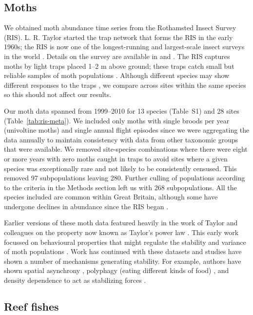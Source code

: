 \subsection{Moths}
We obtained moth abundance time series from the Rothamsted Insect Survey
(RIS). L. R. Taylor started the trap network that forms the RIS in the early
1960s; the RIS is now one of the longest-running and largest-scale insect
surveys in the world \citep{conrad2004}. Details on the survey are
available in \citet{conrad2004} and \citet{taylor1986}. The RIS
captures moths by light traps \citep{williams1948} placed 1--2 m above
ground; these traps catch small but reliable samples of moth populations
\citep{williams1948, taylor1974, conrad2004}. Although
different species may show different responses to the traps
\citep{muirhead-thomson1991, woiwod1992}, we compare across sites
within the same species so this should not affect our results.

Our moth data spanned from 1999--2010 for 13 species (Table~S1) and 28 sites
(Table~\ref{tab:ris-meta}). We included only moths with single broods per year
(univoltine moths) and single annual flight episodes since we were aggregating
the data annually to maintain consistency with data from other taxonomic
groups that were available. We removed site-species combinations where there
were eight or more years with zero moths caught in traps to avoid sites where
a given species was exceptionally rare and not likely to be consistently
censused. This removed 97 subpopulations leaving 280. Further culling of
populations according to the criteria in the Methods section left us with 268
subpopulations. All the species included are common within Great Britain,
although some have undergone declines in abundance since the RIS began
\citep{conrad2004}.

Earlier versions of these moth data featured heavily in the work of
Taylor and colleagues on the property now known as Taylor's power law
\citep{taylor1977, taylor1980, perry1981}. This early work
focussed on behavioural properties that might regulate the stability and
variance of moth populations \citep{taylor1980}. Work has continued with
these datasets and studies have shown a number of mechanisms generating
stability. For example, authors have shown spatial asynchrony
\citep{gaston1988}, polyphagy (eating different kinds of food)
\citep{redfearn1988}, and density dependence to act as stabilizing forces
\citep{hanski1993}.

\subsection{Reef fishes}

